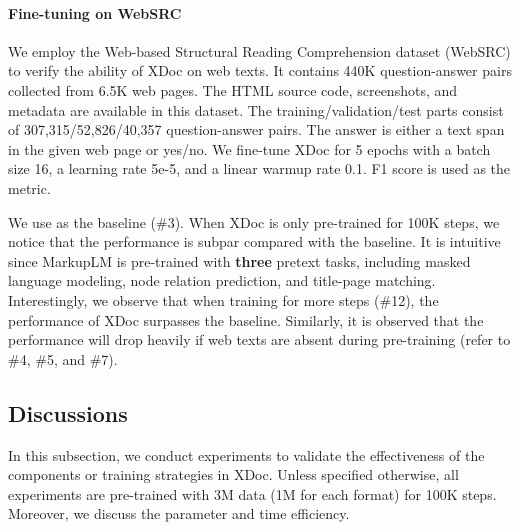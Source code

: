 \documentclass[11pt]{article}
\begin{document}
\paragraph{Fine-tuning on WebSRC}
We employ the Web-based Structural Reading Comprehension dataset (WebSRC) \cite{chen2021websrc} to verify the ability of XDoc on web texts. It contains 440K question-answer pairs collected from 6.5K web pages. The HTML source code, screenshots, and metadata are available in this dataset. The training/validation/test parts consist of 307,315/52,826/40,357 question-answer pairs. The answer is either a text span in the given web page or yes/no. We fine-tune XDoc for 5 epochs with a batch size 16, a learning rate 5e-5, and a linear warmup rate 0.1. F1 score is used as the metric. 

We use  \cite{li2021markuplm} as the baseline (\#3). When XDoc is only pre-trained for 100K steps, we notice that the performance is subpar compared with the baseline. It is intuitive since MarkupLM is pre-trained with \textbf{three} pretext tasks, including masked language modeling, node relation prediction, and title-page matching. Interestingly, we observe that when training for more steps (\#12), the performance of XDoc surpasses the baseline. Similarly, it is observed that the performance will drop heavily if web texts are absent during pre-training (refer to \#4, \#5, and \#7).






\subsection{Discussions} \label{sec:discussion}
In this subsection, we conduct experiments to validate the effectiveness of the components or training strategies in XDoc. Unless specified otherwise, all experiments are pre-trained with 3M data (1M for each format) for 100K steps. Moreover, we discuss the parameter and time efficiency.



\begin{table}[t]
\centering
{}
\caption{Results on the initialization of XDoc.}
\label{tab:init}
\end{table}
\end{document}
